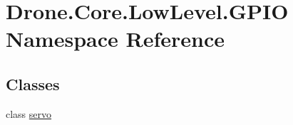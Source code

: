 \hypertarget{namespace_drone_1_1_core_1_1_low_level_1_1_g_p_i_o}{}\section{Drone.\+Core.\+Low\+Level.\+G\+P\+I\+O Namespace Reference}
\label{namespace_drone_1_1_core_1_1_low_level_1_1_g_p_i_o}
\subsection*{Classes}
\begin{DoxyCompactItemize}
\item 
class \hyperlink{class_drone_1_1_core_1_1_low_level_1_1_g_p_i_o_1_1servo}{servo}
\end{DoxyCompactItemize}

